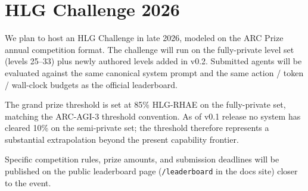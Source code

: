 \section{HLG Challenge 2026}
\label{sec:challenge}

We plan to host an HLG Challenge in late 2026, modeled on the ARC Prize annual
competition format. The challenge will run on the fully-private level set (levels 25--33)
plus newly authored levels added in v0.2. Submitted agents will be evaluated against
the same canonical system prompt and the same action / token / wall-clock budgets as the
official leaderboard.

The grand prize threshold is set at 85\% HLG-RHAE on the fully-private set, matching the
ARC-AGI-3 threshold convention. As of v0.1 release no system has cleared 10\% on the
semi-private set; the threshold therefore represents a substantial extrapolation
beyond the present capability frontier.

Specific competition rules, prize amounts, and submission deadlines will be published
on the public leaderboard page (\texttt{/leaderboard} in the docs site) closer to
the event.
